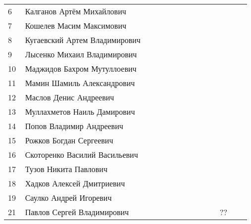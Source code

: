 \documentclass[a4paper,landscape,11pt]{article}
\newcommand*\ok{&{\small \ding{51}}} %
\newcommand*\no{&{\small }} %
\begin{document}
\begin{tabular}{p{7pt}|l|p{6pt}p{6pt}p{6pt}p{6pt}p{6pt}p{6pt}p{6pt}p{6pt}p{6pt}p{6pt}p{6pt}p{6pt}}
 6\,&Калганов Артём Михайлович         \ok\no\ok\ok\ok\no\ok\ok\ok\ok\ok\ok\\
 7\,&Кошелев Масим Максимович          \no\no\no\no\no\no\no\no\no\ok\no\no\\
 8\,&Кугаевский Артем Владимирович     \ok\no\no\ok\ok\no\no\ok\ok\ok\ok\ok\\
 9\,&Лысенко Михаил Владимирович       \ok\ok\ok\ok\ok\ok\ok\ok\ok\ok\ok\ok\\
10\,&Маджидов Бахром Мутуллоевич       \no\no\no\no\no\no\no\no\\
11\,&Мамин Шамиль Александрович        \ok\no\no\ok\ok\no\ok\ok\ok\ok\ok\ok\\
\midrule
12\,&Маслов Денис Андреевич            \ok\ok\ok\ok\ok\no\no\ok\ok\ok\ok\ok\\
13\,&Муллахметов Наиль Дамирович       \ok\ok\no\ok\no\no\ok\no\ok\ok\no\no\\
14\,&Попов Владимир Андреевич          \ok\ok\no\ok\ok\ok\ok\ok\ok\ok\no\no\\
15\,&Рожков Богдан Сергеевич           \no\no\no\no\no\no\no\no\\
16\,&Скоторенко Василий Васильевич     \ok\ok\ok\ok\ok\ok\ok\ok\ok\ok\ok\ok\\
17\,&Тузов Никита Павлович             \ok\ok\ok\ok\ok\ok\ok\ok\ok\ok\ok\ok\\
18\,&Хадков Алексей Дмитриевич         \ok\no\ok\ok\ok\ok\ok\ok\ok\ok\ok\ok\\
19\,&Саулко Андрей Игоревич            \ok\no\no\ok\ok\no\no\ok\ok\ok\ok\ok\\
21\,&Павлов Сергей Владимирович        \ok\ok\no\ok\no\no\no\ok\no&??\ok\ok\\   
\bottomrule
\end{tabular} 
\newpage
%
\hspace{-3cm}
\end{document}
